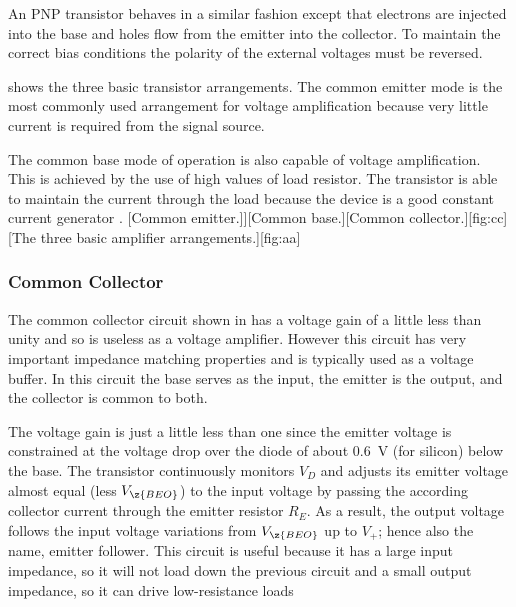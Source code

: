 %
An PNP transistor behaves in a similar fashion except that electrons are injected into the base and holes flow from the emitter into the collector. To maintain the correct bias conditions the polarity of the external voltages must be reversed.\par
%
 shows the three basic transistor arrangements. The common emitter mode is the most commonly used arrangement for voltage amplification because very little current is required from the signal source.\par
%
The common base mode of operation is also capable of voltage amplification. This is achieved by the use of high values of load resistor. The transistor is able to maintain the current through the load because the device is a good constant current generator \cite{olsen}.
%
\subfigs[\subfig[.3]{.2}{commonemitter}[Common emitter.]]{[Common base.]}{[Common collector.][fig:cc]}[The three basic amplifier arrangements.][fig:aa]
%
\subsubsection{Common Collector}
The common collector circuit shown in  has a voltage gain of a little less than unity and so is useless as a voltage amplifier. However this circuit has very important impedance matching properties and is typically used as a voltage buffer. In this circuit the base serves as the input, the emitter is the output, and the collector is common to both.\par
%
The voltage gain is just a little less than one since the emitter voltage is constrained at the voltage drop over the diode of about \SI{0.6}{\volt} (for silicon) below the base. The transistor continuously monitors $V_{D}$ and adjusts its emitter voltage almost equal (less $V_{\z{BEO}}$) to the input voltage by passing the according collector current through the emitter resistor $R_{E}$. As a result, the output voltage follows the input voltage variations from $V_{\z{BEO}}$ up to $V_{+}$; hence also the name, emitter follower. This circuit is useful because it has a large input impedance, so it will not load down the previous circuit and a small output impedance, so it can drive low-resistance loads
%
